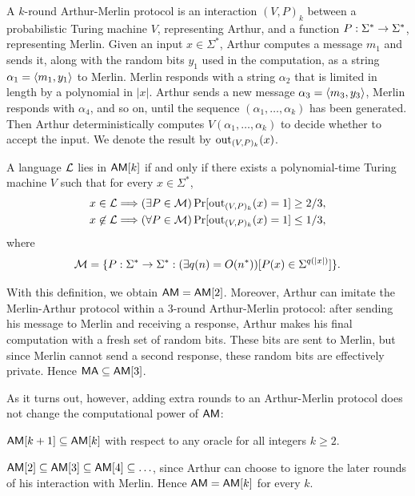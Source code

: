 \begin{definition}
A $k$-round Arthur-Merlin protocol is an interaction $(V,P)_k$ between a 
probabilistic Turing machine $V$, representing Arthur, and a function 
$P:\Sigma^*\rightarrow\Sigma^*$, representing Merlin. Given an input $x\in\Sigma^*$, 
Arthur computes a message $m_1$ and sends it, along with the random bits $y_1$ 
used in the computation, as a string $\alpha_1=\left\langle m_1,y_1\right\rangle$ to Merlin. 
Merlin responds with a string $\alpha_2$ that is limited in length by a 
polynomial in $|x|$. Arthur sends a new message $\alpha_3=\left\langle m_3,y_3\right\rangle$, 
Merlin responds with $\alpha_4$, and so on, until the sequence 
$(\alpha_1,\ldots,\alpha_k)$ has been generated. Then Arthur deterministically 
computes $V(\alpha_1,\ldots,\alpha_k)$ to decide whether to accept the input. 
We denote the result by $\operatorname{out}_{(V,P)_k}(x)$.

A language $\mathcal{L}$ lies in $\mathsf{AM}[k]$ if and only if there exists a 
polynomial-time Turing machine $V$ such that for every $x\in\Sigma^*$,
\begin{align*}
x\in\mathcal{L}&\Longrightarrow
(\exists P\in\mathcal{M})\Pr[\operatorname{out}_{(V,P)_k}(x)=1]\geq 2/3, \\
x\not\in\mathcal{L}&\Longrightarrow
(\forall P\in\mathcal{M})\Pr[\operatorname{out}_{(V,P)_k}(x)=1]\leq 1/3,
\end{align*}
where
\[
\mathcal{M}=\{P:\Sigma^*\rightarrow\Sigma^*:(\exists 
q(n)=O(n^*))[P(x)\in\Sigma^{q(|x|)}]\}.
\]
\end{definition}
With this definition, we obtain $\mathsf{AM}=\mathsf{AM}[2]$. Moreover, Arthur can 
imitate the Merlin-Arthur protocol within a 3-round Arthur-Merlin protocol: 
after sending his message to Merlin and receiving a response, Arthur makes his 
final computation with a fresh set of random bits. These bits are sent to 
Merlin, but since Merlin cannot send a second response, these random bits are 
effectively private. Hence $\mathsf{MA}\subseteq\mathsf{AM}[3]$.

As it turns out, however, adding extra rounds to an Arthur-Merlin protocol does 
not change the computational power of $\mathsf{AM}$:
\begin{theorem}
$\mathsf{AM}[k+1]\subseteq\mathsf{AM}[k]$ with respect to any oracle for all integers 
$k\geq 2$.
\end{theorem}
$\mathsf{AM}[2]\subseteq\mathsf{AM}[3]\subseteq\mathsf{AM}[4]\subseteq\ldots$, since Arthur 
can choose to ignore the later rounds of his interaction with Merlin. Hence 
$\mathsf{AM}=\mathsf{AM}[k]$ for every $k$.

